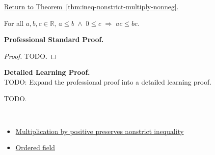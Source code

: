 \newpage
{}
\label{prf:ineq-nonstrict-multiply-nonneg}

\begin{remark*}[Return]
\hyperref[thm:ineq-nonstrict-multiply-nonneg]{Return to Theorem~\ref*{thm:ineq-nonstrict-multiply-nonneg}.}
\end{remark*}

\begin{theorem*}
For all $a, b, c \in \mathbb{R}$,
$a \le b \;\land\; 0 \le c \;\Rightarrow\; ac \le bc$.
\end{theorem*}

\textbf{Professional Standard Proof.}~\\
\begin{proof}
TODO.
\end{proof}

\textbf{Detailed Learning Proof.}~\\
TODO: Expand the professional proof into a detailed learning proof.


\begin{remark*}
TODO.
\end{remark*}

\begin{remark*}[Dependencies]~\\
\begin{itemize}
  \item \hyperref[thm:ineq-nonstrict-multiply-positive]{Multiplication by positive preserves nonstrict inequality}
  \item \hyperref[def:ordered-field]{Ordered field}
\end{itemize}
\end{remark*}
